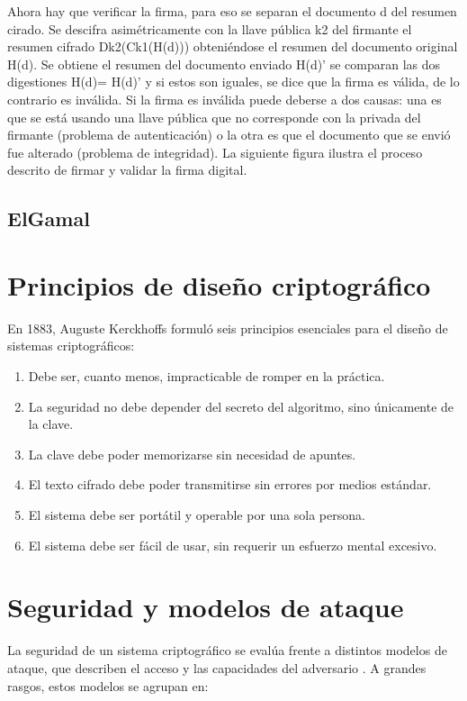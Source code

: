 Ahora hay que verificar la firma, para eso se separan el documento d del resumen cirado. Se descifra
asimétricamente con la llave pública k2 del firmante el resumen cifrado Dk2(Ck1(H(d))) obteniéndose el
resumen del documento original H(d). Se obtiene el resumen del documento enviado H(d)’ se comparan
las dos digestiones H(d)= H(d)’ y si estos son iguales, se dice que la firma es válida, de lo contrario es
inválida. Si la firma es inválida puede deberse a dos causas: una es que se está usando una llave pública
que no corresponde con la privada del firmante (problema de autenticación) o la otra es que el documento
que se envió fue alterado (problema de integridad). La siguiente figura ilustra el proceso descrito de firmar
y validar la firma digital.
\subsection{ElGamal}

\section{Principios de diseño criptográfico}

En 1883, Auguste Kerckhoffs formuló seis principios esenciales para el diseño de sistemas criptográficos:

\begin{enumerate}
  \item Debe ser, cuanto menos, impracticable de romper en la práctica.
  \item La seguridad no debe depender del secreto del algoritmo, sino únicamente de la clave.
  \item La clave debe poder memorizarse sin necesidad de apuntes.
  \item El texto cifrado debe poder transmitirse sin errores por medios estándar.
  \item El sistema debe ser portátil y operable por una sola persona.
  \item El sistema debe ser fácil de usar, sin requerir un esfuerzo mental excesivo.
\end{enumerate}
\section{Seguridad y modelos de ataque}

La seguridad de un sistema criptográfico se evalúa frente a distintos modelos de ataque, que describen el acceso y las capacidades del adversario \cite{turn1search3}. A grandes rasgos, estos modelos se agrupan en:

